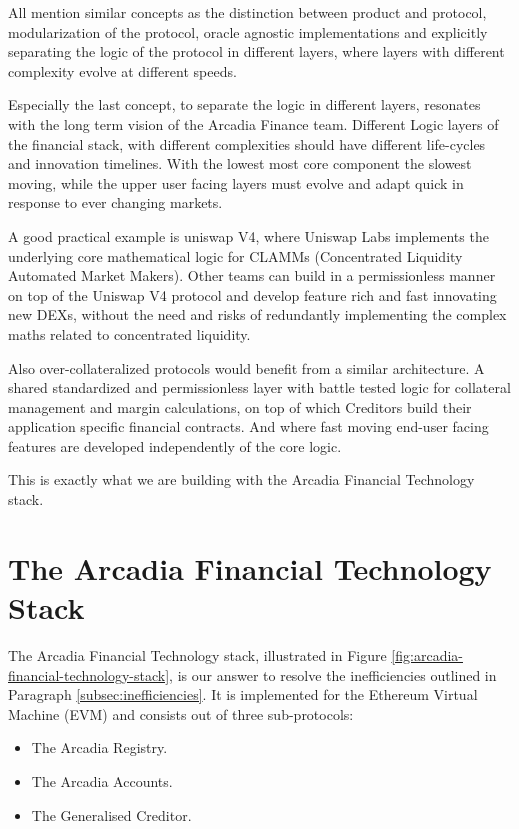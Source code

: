 \documentclass[sigconf,nonacm]{acmart}
\begin{document}
All mention similar concepts as the distinction between product and protocol, modularization of the protocol,
oracle agnostic implementations and explicitly separating the logic of the protocol in different layers,
where layers with different complexity evolve at different speeds.

Especially the last concept, to separate the logic in different layers, resonates with the long term vision of the Arcadia Finance team.
Different Logic layers of the financial stack, with different complexities should have different life-cycles and innovation timelines.
With the lowest most core component the slowest moving, while the upper user facing layers must evolve and adapt quick in response to ever changing markets.

A good practical example is uniswap V4,
where Uniswap Labs implements the underlying core mathematical logic for CLAMMs (Concentrated Liquidity Automated Market Makers).
Other teams can build in a permissionless manner on top of the Uniswap V4 protocol and develop feature rich and fast innovating new DEXs,
without the need and risks of redundantly implementing the complex maths related to concentrated liquidity.

Also over-collateralized protocols would benefit from a similar architecture.
A shared standardized and permissionless layer with battle tested logic for collateral management and margin calculations,
on top of which Creditors build their application specific financial contracts.
And where fast moving end-user facing features are developed independently of the core logic.

This is exactly what we are building with the Arcadia Financial Technology stack.

\section{The Arcadia Financial Technology Stack}
\label{sec:arcadia-financial-technology-stack}

The Arcadia Financial Technology stack, illustrated in Figure \ref{fig:arcadia-financial-technology-stack},
is our answer to resolve the inefficiencies outlined in Paragraph \ref{subsec:inefficiencies}.
It is implemented for the Ethereum Virtual Machine (EVM) and consists out of three sub-protocols:
\begin{itemize}
    \item The Arcadia Registry.
    \item The Arcadia Accounts.
    \item The Generalised Creditor.
\end{itemize}
\end{document}
